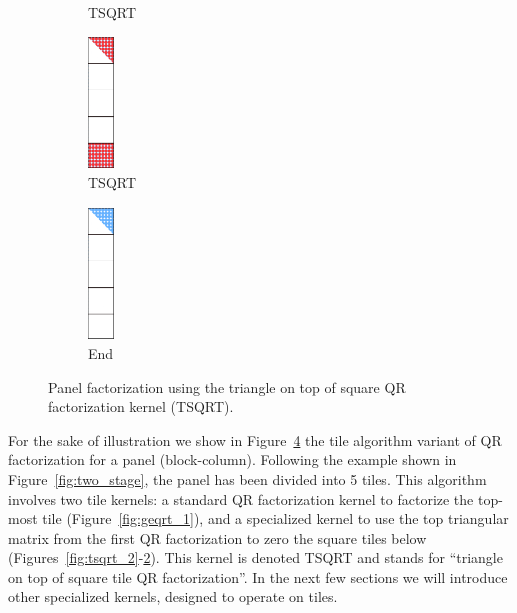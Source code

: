 \begin{figure}[h!]
\begin{subfigure}[t]{0.160 \textwidth}
      \caption{\label{fig:tsqrt_4}TSQRT}
    \end{subfigure}
    \hfill
    \begin{subfigure}[t]{0.160 \textwidth}
      \includegraphics[width=0.7cm, height=3.5cm]{fig/SVD_rect_panel_7}
      \caption{\label{fig:tsqrt_5}TSQRT}
    \end{subfigure}
    \hfill
    \begin{subfigure}[t]{0.160 \textwidth}
      \includegraphics[width=0.7cm, height=3.5cm]{fig/SVD_rect_panel_8}
      \caption{\label{fig:tsqrt_output}End}
    \end{subfigure}
    \caption{Panel factorization using the triangle on top of square QR factorization kernel (TSQRT).
    \label{fig:rect_panel}}
\end{figure}

For the sake of illustration we show in Figure~\ref{fig:rect_panel}
the tile algorithm variant of QR factorization for a panel
(block-column).
Following the example shown in
Figure~\ref{fig:two_stage}, the panel has been divided into 5 tiles.
This algorithm involves two tile kernels:
a standard QR factorization kernel to
factorize the top-most tile (Figure~\ref{fig:geqrt_1}),
and a specialized kernel to use the top triangular matrix
from the first QR factorization
to zero the square tiles below (Figures~\ref{fig:tsqrt_2}-\ref{fig:tsqrt_5}).
This kernel is denoted TSQRT and stands
for ``triangle on top of square tile QR factorization''.
In the next few sections we will introduce other specialized kernels,
designed to operate on tiles.
